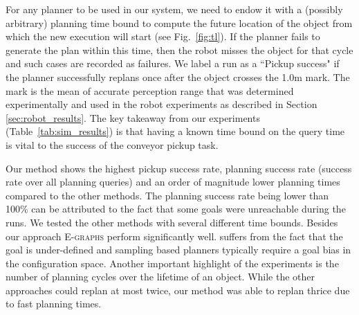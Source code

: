 \documentclass[conference]{IEEEtran}
\begin{document}
For any planner to be used in our system, we need to endow it with a (possibly arbitrary) planning time bound to compute the future location of the object from which the new execution will start (see Fig.~\ref{fig:tl}). 
%
If the planner fails to generate the plan within this time, then the robot misses the object for that cycle and such cases are recorded as failures. 
%
We label a run as a ``Pickup success" if the planner successfully replans once after the object crosses the 1.0m mark. The mark is the mean of accurate perception range that was determined experimentally and used in the robot experiments as described in Section \ref{sec:robot_results}.
%
The key takeaway from our experiments (Table~\ref{tab:sim_results}) is that having a known time bound on the query time is vital to the success of the conveyor pickup task.

Our method shows the highest pickup success rate, planning success rate (success rate over all planning queries) and an order of magnitude lower planning times compared to the other methods. 
The planning success rate being lower than 100\% can be attributed to the fact that some goals were unreachable during the runs. 
%
We tested the other methods with several different time bounds. Besides our approach \textsc{E-graphs} perform significantly well. \rrt suffers from the fact that the goal is under-defined and sampling based planners typically require a goal bias in the configuration space. Another important highlight of the experiments is the number of planning cycles over the lifetime of an object. While the other approaches could replan at most twice, our method was able to replan thrice due to fast planning times.
\end{document}
